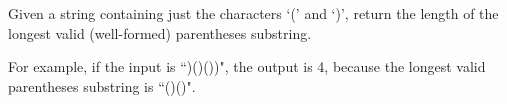 \problem{}
Given a string containing just the characters `(' and `)', return the length of the longest valid (well-formed) parentheses substring.

For example, if the input is ``)()())", the output is 4, because the longest valid parentheses substring is ``()()".


\solution{
}


\newpage